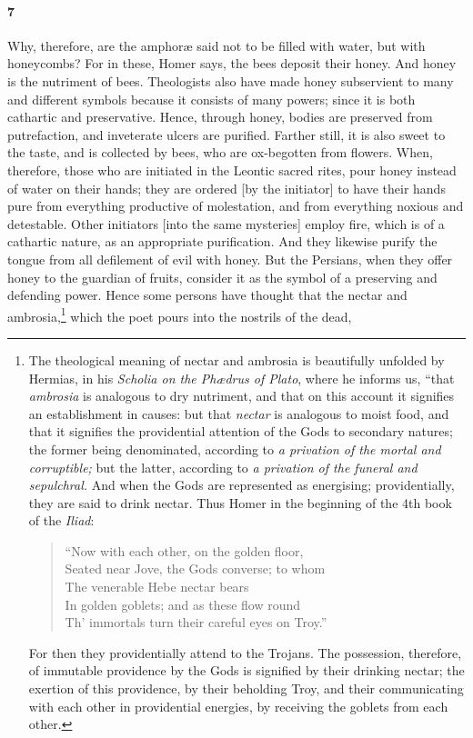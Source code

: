 \documentclass[a4paper,12pt]{article}
\begin{document}
\paragraph{7} Why, therefore, are the amphor{\ae} said not to be filled with
water, but with honeycombs? For in these, Homer says, the bees deposit their
honey. And honey is the nutriment of bees. Theologists also have made honey
subservient to many and different symbols because it consists of many powers;
since it is both cathartic and preservative. Hence, through honey, bodies are
preserved from putrefaction, and inveterate ulcers are purified. Farther still,
it is also sweet to the taste, and is collected by bees, who are ox-begotten
from flowers. When, therefore, those who are initiated in the Leontic sacred
rites, pour honey instead of water on their hands; they are ordered [by the
initiator] to have their hands pure from everything productive of molestation,
and from everything noxious and detestable. Other initiators [into the same
mysteries] employ fire, which is of a cathartic nature, as an appropriate
purification. And they likewise purify the tongue from all defilement of evil
with honey. But the Persians, when they offer honey to the guardian of fruits,
consider it as the symbol of a preserving and defending power. Hence some
persons have thought that the nectar and ambrosia,\footnote{The theological
meaning of nectar and ambrosia is beautifully unfolded by Hermias, in his
\textit{Scholia on the Ph{\ae}drus of Plato}, where he informs us, ``that
\textit{ambrosia} is analogous to dry nutriment, and that on this account it
signifies an establishment in causes: but that \textit{nectar} is analogous to
moist food, and that it signifies the providential attention of the Gods to
secondary natures; the former being denominated, according to \textit{a
privation of the mortal and corruptible;} but the latter, according to
\textit{a privation of the funeral and sepulchral.} And when the Gods are
represented as energising; providentially, they are said to drink nectar. Thus
Homer in the beginning of the 4th book of the \textit{Iliad}:

\begin{verse}
``Now with each other, on the golden floor,\\
Seated near Jove, the Gods converse; to whom\\
The venerable Hebe nectar bears\\
In golden goblets; and as these flow round\\
Th' immortals turn their careful eyes on Troy.''
\end{verse}

\noindent For then they providentially attend to the Trojans. The possession,
therefore, of immutable providence by the Gods is signified by their drinking
nectar; the exertion of this providence, by their beholding Troy, and their
communicating with each other in providential energies, by receiving the
goblets from each other.} which the poet pours into the nostrils of the dead,
\end{document}
